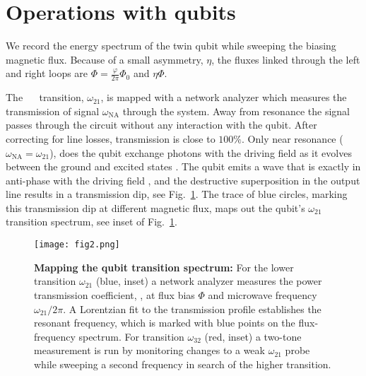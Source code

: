 
\section{Operations with qubits}
\label{sec:characterisation}


\noindent We record the energy spectrum of  the twin qubit while sweeping the biasing magnetic
flux.  Because of a  small asymmetry, $\eta$, the fluxes linked through the  left and right loops
are $ \Phi = \frac{\varphi}{2\pi}\Phi_0$ and $ \eta\Phi $.

The  ~\ilra~ transition,  $\omega_{21}$, is  mapped with  a network  analyzer which
measures the transmission  of signal $\omega_{\text{NA}}$ through the system.   Away from resonance
the  signal  passes  through the  circuit  without  any  interaction  with the  qubit.   After
correcting  for  line losses,  transmission  is  close to  $  100\%  $.  Only  near  resonance
($\omega_{\text{NA}}=\omega_{21}$), does the qubit exchange photons with the driving field as it evolves
between the ground and excited states \cite{rabi}.  The  qubit emits a wave that is exactly in
anti-phase with the driving field \cite{abdumalikov2010}, and the destructive superposition in
the output line  results in a transmission dip, see  Fig.~\ref{fig:transmission}. The trace of
blue circles, marking this  transmission dip at different magnetic flux,  maps out the qubit's
$\omega_{21}$ transition spectrum, see inset of Fig.~\ref{fig:transmission}.

\begin{figure}[h]
  \centering \texttt{[image: fig2.png]}
  \caption{\small \textbf{Mapping  the qubit transition  spectrum:}  For the  lower transition
    $\omega_{21}$ (blue,  inset) a  network analyzer measures  the power  transmission coefficient,
    , at flux  bias $ \Phi $  and microwave frequency $  \omega_{21}/2\pi$.  A Lorentzian
    fit \cite{Astafiev2010}  to the transmission  profile establishes the  resonant frequency,
    which  is  marked  with  blue  points on  the  flux-frequency  spectrum.   For  transition
    $\omega_{32}$  (red, inset)  a two-tone  measurement is  run by  monitoring changes  to a  weak
    $\omega_{21}$ probe while sweeping a second frequency  in search of the higher transition.
  }
  \label{fig:transmission}
\end{figure}

